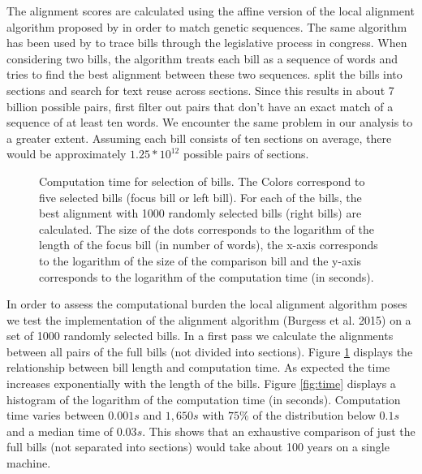 \documentclass[12pt]{article} %
\begin{document}
The alignment scores are calculated using the affine version of the local alignment algorithm proposed by \citet{smith1981identification} in order to match genetic sequences. The same algorithm has been used by \citet{wilkerson2015tracing} to trace bills through the legislative process in congress. When considering two bills, the algorithm treats each bill as a sequence of words and tries to find the best alignment between these two sequences. \citet{wilkerson2015tracing} split the bills into sections and search for text reuse across sections. Since this results in about 7 billion possible pairs, first filter out pairs that don't have an exact match of a sequence of at least ten words. We encounter the same problem in our analysis to a greater extent. Assuming each bill consists of ten sections on average, there would be approximately $1.25 * 10^{12}$ possible pairs of sections. 

\begin{figure}[ht!]
\caption{Computation time for selection of bills. The Colors correspond to five selected bills (focus bill or left bill). For each of the bills, the best alignment with 1000 randomly selected bills (right bills) are calculated. The size of the dots corresponds to the logarithm of the length of the focus bill (in number of words), the x-axis corresponds to the logarithm of the size of the comparison bill and the y-axis corresponds to the logarithm of the computation time (in seconds).}
\label{fig:time_size}
\end{figure}

In order to assess the computational burden the local alignment algorithm poses we test the implementation of the alignment algorithm (Burgess et al. 2015) on a set of 1000 randomly selected bills. In a first pass we calculate the alignments  between all pairs of the full bills (not divided into sections). Figure \ref{fig:time_size} displays the relationship between bill length and computation time. As expected the time increases exponentially with the length of the bills. Figure \ref{fig:time} displays a histogram of the logarithm of the computation time (in seconds). Computation time varies between $0.001s$ and $1,650s$ with $75\%$ of the distribution below $0.1s$ and a median time of $0.03s$.  This shows that an exhaustive comparison of just the full bills (not separated into sections) would take about 100 years on a single machine.
\end{document}

